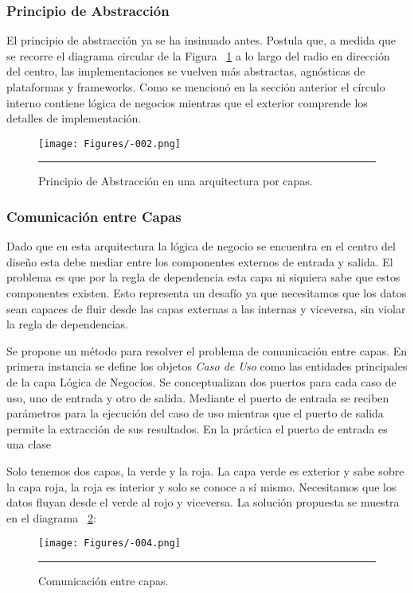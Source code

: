 \subsubsection{Principio de Abstracción}
El principio de abstracción ya se ha insinuado antes. Postula que, a medida que se recorre el diagrama circular de la Figura ~\ref{fig:C2_PA} a lo largo del radio en dirección del centro, las implementaciones se vuelven más abstractas, agnósticas de plataformas y frameworks. Como se mencionó en la sección anterior el círculo interno contiene lógica de negocios mientras que el exterior comprende los detalles de implementación.

\begin{figure}[htbp]
	\centering
	\texttt{[image: Figures/-002.png]}
	\rule{35em}{1pt}
	\caption[Abstraction Principle]{Principio de Abstracción en una arquitectura por capas.}
	\label{fig:C2_PA}
\end{figure}

\subsubsection{Comunicación entre Capas}
Dado que en esta arquitectura la lógica de negocio se encuentra en el centro del diseño esta debe mediar entre los componentes externos de entrada y salida.
El problema es que por la regla de dependencia esta capa ni siquiera sabe que estos componentes existen.
Esto representa un desafío ya que necesitamos que los datos sean capaces de fluir desde las capas externas a las internas y viceversa, sin violar la regla de dependencias.


Se propone un método para resolver el problema de comunicación entre capas.
En primera instancia se define los objetos \emph{Caso de Uso} como las entidades principales de la capa Lógica de Negocios.
Se conceptualizan dos puertos para cada caso de uso, uno de entrada y otro de salida.
Mediante el puerto de entrada se reciben parámetros para la ejecución del caso de uso mientras que el puerto de salida permite la extracción de sus resultados.
En la práctica el puerto de entrada es una clase 

 
Solo tenemos dos capas, la verde y la roja. La capa verde es exterior y sabe sobre la capa roja, la roja es interior y solo se conoce a sí mismo. Necesitamos que los datos fluyan desde el verde al rojo y viceversa. La solución propuesta se muestra en el diagrama ~\ref{fig:C2_CC_01}:

\begin{figure}[htbp]
	\centering
	\texttt{[image: Figures/-004.png]}
	\rule{35em}{1pt}
	\caption[Layer Communication]{Comunicación entre capas.}
	\label{fig:C2_CC_01}
\end{figure}

